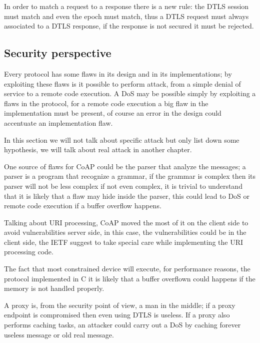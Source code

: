 	In order to match a request to a response there is a new rule: the DTLS session must match and even the epoch must match, thus a DTLS request must always associated to a DTLS response, if the response is not secured it must be rejected.
	
	\subsection{Security perspective}
	Every protocol has some flaws in its design and in its implementations; by exploiting these flaws is it possible to perform attack, from a simple denial of service to a remote code execution.\newline
	A DoS may be possible simply by exploiting a flaws in the protocol, for a remote code execution a big flaw in the implementation must be present, of course an error in the design could accentuate an implementation flaw.\newline
	
	In this section we will not talk about specific attack but only list down some hypothesis, we will talk about real attack in another chapter.\newline
	
	One source of flaws for CoAP could be the parser that analyze the messages; a parser is a program that recognize a grammar, if the grammar is complex then its parser will not be less complex if not even complex, it is trivial to understand that it is likely that a flaw may hide inside the parser, this could lead to DoS or remote code execution if a buffer overflow happens.\newline
	
	Talking about URI processing, CoAP moved the most of it on the client side to avoid vulnerabilities server side, in this case, the vulnerabilities could be in the client side, the IETF suggest to take special care while implementing the URI processing code.\newline
	
	The fact that most constrained device will execute, for performance reasons, the protocol implemented in C it is likely that a buffer overflown could happens if the memory is not handled properly. \newline
	
	A proxy is, from the security point of view, a man in the middle; if a proxy endpoint is compromised then even using DTLS is useless.\newline
	If a proxy also performs caching tasks, an attacker could carry out a DoS by caching forever useless message or old real message.\newline
	
